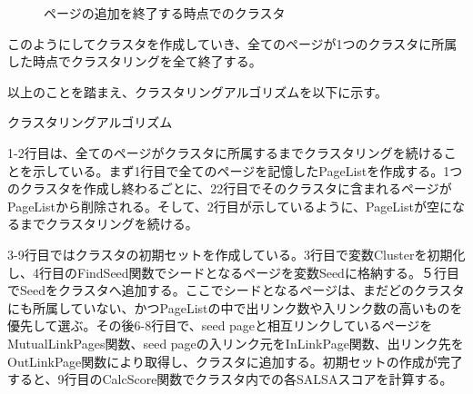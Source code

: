 \documentclass[a4paper,11pt]{jreport}
\begin{document}
\begin{figure}[htbp]
\begin{center}
\end{center}
\caption{ページの追加を終了する時点でのクラスタ}
\label{figure:sample}
\end{figure}

このようにしてクラスタを作成していき、全てのページが1つのクラスタに所属した時点でクラスタリングを全て終了する。

以上のことを踏まえ、クラスタリングアルゴリズムを以下に示す。

\newpage
\begin{algorithm}
\caption{クラスタリングアルゴリズム}
\begin{algorithmic}[1]

\LOOP
{}
\ENDIF
{}
\ENDIF
{}
\ENDIF
\ENDLOOP
{}
\ENDWHILE

\end{algorithmic}
\end{algorithm}

1-2行目は、全てのページがクラスタに所属するまでクラスタリングを続けることを示している。まず1行目で全てのページを記憶したPageListを作成する。1つのクラスタを作成し終わるごとに、22行目でそのクラスタに含まれるページがPageListから削除される。そして、2行目が示しているように、PageListが空になるまでクラスタリングを続ける。

3-9行目ではクラスタの初期セットを作成している。3行目で変数Clusterを初期化し、4行目のFindSeed関数でシードとなるページを変数Seedに格納する。５行目でSeedをクラスタへ追加する。ここでシードとなるページは、まだどのクラスタにも所属していない、かつPageListの中で出リンク数や入リンク数の高いものを優先して選ぶ。その後6-8行目で、seed pageと相互リンクしているページをMutualLinkPages関数、seed pageの入リンク元をInLinkPage関数、出リンク先をOutLinkPage関数により取得し、クラスタに追加する。初期セットの作成が完了すると、9行目のCalcScore関数でクラスタ内での各SALSAスコアを計算する。
\end{document}
